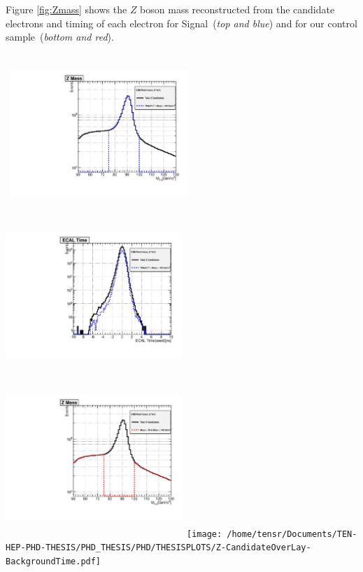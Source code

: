 Figure \ref{fig:Zmass} shows the $Z$ boson mass reconstructed from the candidate electrons and timing of each electron for Signal~(\textit{top and blue}) and for our control sample~(\textit{bottom and red}).

\begin{center}
\centering
\mbox{
\includegraphics[height=6cm, width=0.5\textwidth]{THESISPLOTS/Z-CandidateOverLay-SignalMass.pdf}
\includegraphics[height=6cm, width=0.5\textwidth]{THESISPLOTS/Z-CandidateOverLay-SignalTime.pdf}}
\mbox{
\includegraphics[height=6cm, width=0.5\textwidth]{THESISPLOTS/Z-CandidateOverLay-BackgroundMass.pdf}
\texttt{[image: /home/tensr/Documents/TEN-HEP-PHD-THESIS/PHD\_THESIS/PHD/THESISPLOTS/Z-CandidateOverLay-BackgroundTime.pdf]}}
\label{fig:Zmass}
\end{center}


